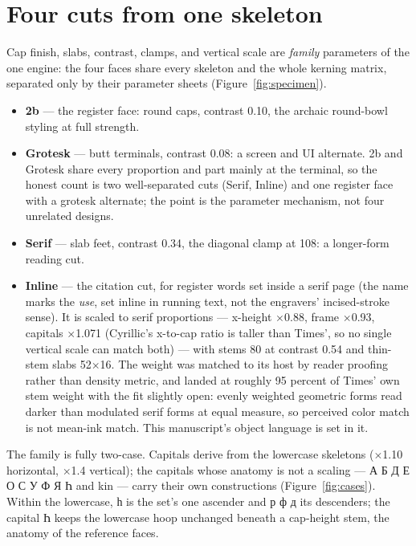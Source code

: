 \documentclass[11pt]{article}
\newcommand{\cz}[1]{{\chu #1}}
\begin{document}
\section{Four cuts from one skeleton}\label{sec:cuts}

Cap finish, slabs, contrast, clamps, and vertical scale are \emph{family} parameters of the one engine: the four faces share every skeleton and the whole kerning matrix, separated only by their parameter sheets (Figure~\ref{fig:specimen}).

\begin{itemize}
\item \textbf{2b} — the register face: round caps, contrast 0.10, the archaic round-bowl styling at full strength.
\item \textbf{Grotesk} — butt terminals, contrast 0.08: a screen and UI alternate. 2b and Grotesk share every proportion and part mainly at the terminal, so the honest count is two well-separated cuts (Serif, Inline) and one register face with a grotesk alternate; the point is the parameter mechanism, not four unrelated designs.
\item \textbf{Serif} — slab feet, contrast 0.34, the diagonal clamp at 108: a longer-form reading cut.
\item \textbf{Inline} — the citation cut, for register words set inside a serif page (the name marks the \emph{use}, set inline in running text, not the engravers' incised-stroke sense). It is scaled to serif proportions — x-height $\times$0.88, frame $\times$0.93, capitals $\times$1.071 (Cyrillic's x-to-cap ratio is taller than Times', so no single vertical scale can match both) — with stems 80 at contrast 0.54 and thin-stem slabs 52$\times$16. The weight was matched to its host by reader proofing rather than density metric, and landed at roughly 95 percent of Times' own stem weight with the fit slightly open: evenly weighted geometric forms read darker than modulated serif forms at equal measure, so perceived color match is not mean-ink match. This manuscript's object language is set in it.
\end{itemize}

The family is fully two-case. Capitals derive from the lowercase skeletons ($\times$1.10 horizontal, $\times$1.4 vertical); the capitals whose anatomy is not a scaling — \cz{А Б Д Е О С У Ф Я Һ} and kin — carry their own constructions (Figure~\ref{fig:cases}). Within the lowercase, \cz{һ} is the set's one ascender and \cz{р ф д} its descenders; the capital \cz{Һ} keeps the lowercase hoop unchanged beneath a cap-height stem, the anatomy of the reference faces.
\end{document}
